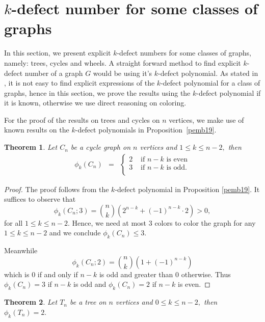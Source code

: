 \documentclass[12pt]{amsart}
\newtheorem{theorem}{Theorem}[section]
\theoremstyle{definition}
\theoremstyle{remark}
\numberwithin{equation}{section}
\begin{document}
 


\section{$k$-defect number for some classes of graphs}
\label{sec3}
In this section, we present  explicit   $k$-defect  numbers for some classes of graphs, namely: trees, cycles and wheels. A straight forward method to find explicit 
 $k$-defect  number of a graph $G$ would be using it's  $k$-defect polynomial. As stated in \cite{EMB19},  it is not easy  to  find explicit expressions of the $k$-defect polynomial for a class of graphs, hence in this section, we prove the results using  the $k$-defect polynomial if it is known, otherwise we  use direct reasoning  on  coloring. 

 For the proof of the results on trees and cycles on $n$ vertices, we make use of known results on the $k$-defect polynomials in Proposition~\ref{pemb19}.

\begin{theorem}\label{kdefCyc}
Let $C_n$  be a cycle graph on $n$ vertices and $1 \leq k \leq n-2,$ then 
\begin{eqnarray*}
\phi_{k}(C_n) &=& \begin{cases}  2 &\text{ if   $n-k$ is even}\\  
 3 & \text{ if $n-k$ is odd.}\\
\end{cases}
\end{eqnarray*}

\end{theorem}
\begin{proof}
The proof follows from the $k$-defect polynomial in Proposition \ref{pemb19}. It suffices to observe that
\[
\phi_k(C_n;3) = {n \choose k}(2^{n-k} + (-1)^{n-k}\cdot 2) > 0,
\] for all $1 \leq k \leq n-2$. Hence, we need at most $3$ colors to color the graph for any  $1 \leq k \leq n-2$ and we conclude $\phi_k(C_n) \leq 3$.

Meanwhile
\[
\phi_k(C_n;2) = {n \choose k}(1 + (-1)^{n-k})
\] which is $0$ if and only if $n-k$ is odd and greater than $0$ otherwise. Thus $\phi_k(C_n)=3$ if $n-k$ is odd and $\phi_k(C_n)=2$ if $n-k$ is even.  
\end{proof}


\begin{theorem}\label{kdefTre}
 Let $T_n$ be a tree on $n$ vertices and $0 \leq k \leq n-2,$ then $\phi_k(T_n) =2.$ 
\end{theorem}
\end{document}

